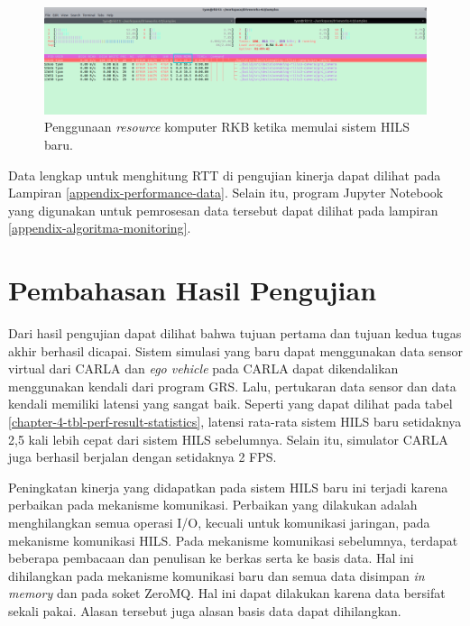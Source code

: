 \begin{figure}[!htbp]
	\centering
	\includegraphics[width=1.0\textwidth,trim={0cm 0cm 0cm 2.5cm},clip]{resources/chapter-4/resource-usage-new-hils-rkb.png}
	\caption{Penggunaan \textit{resource} komputer RKB ketika memulai sistem HILS baru.}
	\label{chapter-4-fig-perf-result-resource-usage-rkb-startup}
\end{figure}

Data lengkap untuk menghitung RTT di pengujian kinerja dapat dilihat pada
Lampiran \ref{appendix-performance-data}. Selain itu, program Jupyter Notebook
yang digunakan untuk pemrosesan data tersebut dapat dilihat pada lampiran
\ref{appendix-algoritma-monitoring}.

\section{Pembahasan Hasil Pengujian}

Dari hasil pengujian dapat dilihat bahwa tujuan pertama dan tujuan kedua tugas
akhir berhasil dicapai. Sistem simulasi yang baru dapat menggunakan data sensor
virtual dari CARLA dan \textit{ego vehicle} pada CARLA dapat dikendalikan
menggunakan kendali dari program GRS. Lalu, pertukaran data sensor dan data
kendali memiliki latensi yang sangat baik. Seperti yang dapat dilihat pada tabel
\ref{chapter-4-tbl-perf-result-statistics}, latensi rata-rata sistem HILS baru
setidaknya 2,5 kali lebih cepat dari sistem HILS sebelumnya. Selain itu,
simulator CARLA juga berhasil berjalan dengan setidaknya 2 FPS.

Peningkatan kinerja yang didapatkan pada sistem HILS baru ini terjadi karena
perbaikan pada mekanisme komunikasi. Perbaikan yang dilakukan adalah
menghilangkan semua operasi I/O, kecuali untuk komunikasi jaringan, pada
mekanisme komunikasi HILS. Pada mekanisme komunikasi sebelumnya, terdapat
beberapa pembacaan dan penulisan ke berkas serta ke basis data. Hal ini
dihilangkan pada  mekanisme komunikasi baru dan semua data disimpan
\textit{in memory} dan pada soket ZeroMQ. Hal ini dapat dilakukan karena data
bersifat sekali pakai. Alasan tersebut juga alasan basis data dapat dihilangkan.

